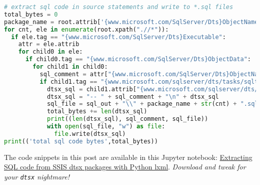\begin{lstlisting}[language=python, frame=single, framerule=0pt, label=lst:scr5673X5]
# extract sql code in source statements and write to *.sql files 
total_bytes = 0
package_name = root.attrib['{www.microsoft.com/SqlServer/Dts}ObjectName'].replace(" ","")
for cnt, ele in enumerate(root.xpath(".//*")):
  if ele.tag == "{www.microsoft.com/SqlServer/Dts}Executable":
    attr = ele.attrib
    for child0 in ele:
      if child0.tag == "{www.microsoft.com/SqlServer/Dts}ObjectData":
        for child1 in child0:
          sql_comment = attr["{www.microsoft.com/SqlServer/Dts}ObjectName"].strip()
          if child1.tag == "{www.microsoft.com/sqlserver/dts/tasks/sqltask}SqlTaskData":
            dtsx_sql = child1.attrib["{www.microsoft.com/sqlserver/dts/tasks/sqltask}SqlStatementSource"]
            dtsx_sql = "-- " + sql_comment + "\n" + dtsx_sql
            sql_file = sql_out + "\\" + package_name + str(cnt) + ".sql"
            total_bytes += len(dtsx_sql)
            print((len(dtsx_sql), sql_comment, sql_file))
            with open(sql_file, "w") as file:
              file.write(dtsx_sql)
print(('total sql code bytes',total_bytes))
\end{lstlisting}


The code snippets in this post are available in this Jupyter notebook:
\href{https://github.com/bakerjd99/jacks/blob/master/notebooks/Extracting\%20SQL\%20code\%20from\%20SSIS\%20dtsx\%20packages\%20with\%20Python\%20lxml.ipynb}{Extracting
SQL code from SSIS dtsx packages with Python lxml}. \emph{Download and tweak
for your \texttt{dtsx} nightmare!}

%
%
%
%
%



%
